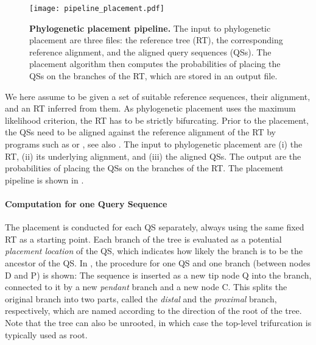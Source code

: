 \begin{figure}[thb]
    \centering
    \texttt{[image: pipeline\_placement.pdf]}
    \caption[Phylogenetic placement pipeline]{
        \textbf{Phylogenetic placement pipeline.}
        The input to phylogenetic placement are three files:
        the reference tree (RT), the corresponding reference alignment, and the aligned query sequences (QSs).
        The placement algorithm then computes the probabilities of placing the QSs on the branches of the RT,
        which are stored in an output file.
    }
    \label{fig:pipeline_placement}
\end{figure}

We here assume to be given a set of suitable reference sequences, their alignment, and an \ac{RT} inferred from them.
As phylogenetic placement uses the maximum likelihood criterion, the \ac{RT} has to be strictly bifurcating.
Prior to the placement, the \acp{QS} need to be aligned against the reference alignment of the \ac{RT}
by programs such as  \cite{Berger2011a,Berger2012} or  \cite{Eddy1998,Eddy2009},
see also .
The input to phylogenetic placement are (i) the \acf{RT}, (ii) its underlying alignment, and (iii) the aligned \acfp{QS}.
The output are the probabilities of placing the \acp{QS} on the branches of the \ac{RT}.
The placement pipeline is shown in .

\paragraph{Computation for one Query Sequence}
\label{ch:Foundations:sec:PhylogeneticPlacement:sub:PipelineAndComputation:par:ComputingQuerySequence}


The placement is conducted for each \ac{QS} separately, always using the same fixed \ac{RT} as a starting point.
Each branch of the tree is evaluated as a potential \emph{placement location} of the \ac{QS},
which indicates how likely the branch is to be the ancestor of the \ac{QS}.
In ,
the procedure for one \ac{QS} and one branch (between nodes {\sffamily D} and {\sffamily P}) is shown:
The sequence is inserted as a new tip node {\sffamily Q} into the branch,
connected to it by a new \emph{pendant} branch and a new node {\sffamily C}.
This splits the original branch into two parts, called the \emph{distal} and the \emph{proximal} branch, respectively,
which are named according to the direction of the root of the tree.
Note that the tree can also be unrooted, in which case the top-level trifurcation is typically used as root.

